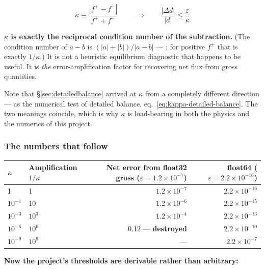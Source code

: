 \begin{equation}
\kappa \equiv \frac{|f^+ - f^-|}{f^+ + f^-} \qquad \implies \qquad
\frac{|\Delta d|}{|d|} \leq \frac{\varepsilon}{\kappa}
\label{eq:kappa-condition}
\end{equation}

\begin{result}
\textbf{$\kappa$ is exactly the reciprocal condition number of the
subtraction.} (The condition number of $a - b$ is $(|a|+|b|)/|a-b|$ ---
\citealt{higham2002}; for positive $f^\pm$ that is exactly $1/\kappa$.) It is
not a heuristic equilibrium diagnostic that happens to be useful. It is
\emph{the} error-amplification factor for recovering net flux from gross
quantities.
\end{result}

Note that \S\ref{sec:detailedbalance} arrived at $\kappa$ from a completely
different direction --- as the numerical test of detailed balance,
eq.~\eqref{eq:kappa-detailed-balance}. The two meanings coincide, which is why
$\kappa$ is load-bearing in both the physics and the numerics of this project.

\subsubsection{The numbers that follow}
\label{sec:kappanumbers}

\begin{center}
\small
\begin{tabularx}{\textwidth}{@{}l l R{1.125} R{0.875}@{}}
\toprule
\textbf{$\kappa$} & \textbf{Amplification $1/\kappa$} &
\textbf{Net error from float32 gross ($\varepsilon = 1.2\times10^{-7}$)} &
\textbf{float64 ($\varepsilon = 2.2\times10^{-16}$)} \\
          & 1          & $1.2\times10^{-7}$ & $2.2\times10^{-16}$ \\
$10^{-1}$  & 10         & $1.2\times10^{-6}$ & $2.2\times10^{-15}$ \\
$10^{-3}$  & $10^{3}$   & $1.2\times10^{-4}$ & $2.2\times10^{-13}$ \\
$10^{-6}$  & $10^{6}$   & 0.12 --- \textbf{destroyed} & $2.2\times10^{-10}$ \\
$10^{-9}$  & $10^{9}$   & --- & $2.2\times10^{-7}$ \\
\bottomrule
\end{tabularx}
\end{center}

\textbf{Now the project's thresholds are derivable rather than arbitrary:}

